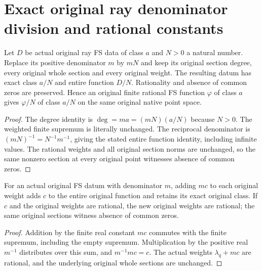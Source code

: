 \section{Exact original ray denominator division and rational constants}

\begin{lemma}
\label{lem:native-tc-nef-fs-ray-denominator-division}
\leanok
{}
Let $D$ be actual original ray FS data of class $a$ and $N>0$ a natural
number.  Replace its positive denominator $m$ by $mN$ and keep its
original section degree, every original whole section and every original
weight.  The resulting datum has exact class $a/N$ and entire function
$D/N$.  Rationality and absence of common zeros are preserved.  Hence
an original finite rational FS function $\varphi$ of class $a$ gives
$\varphi/N$ of class $a/N$ on the same original native point space.
\end{lemma}
\begin{proof}
The degree identity is $\deg=m a=(mN)(a/N)$ because $N>0$.
The weighted finite supremum is literally unchanged.  The reciprocal
denominator is $(mN)^{-1}=N^{-1}m^{-1}$, giving the stated entire
function identity, including infinite values.  The rational weights
and all original section norms are unchanged, so the same nonzero
section at every original point witnesses absence of common zeros.
\end{proof}

\begin{lemma}
\label{lem:native-tc-nef-fs-ray-rational-weight-shift}
\leanok
{}
For an actual original FS datum with denominator $m$, adding $m c$ to
each original weight adds $c$ to the entire original function and
retains its exact original class.  If $c$ and the original weights are
rational, the new original weights are rational; the same original
sections witness absence of common zeros.
\end{lemma}
\begin{proof}
Addition by the finite real constant $mc$ commutes with the finite
supremum, including the empty supremum.  Multiplication by the positive
real $m^{-1}$ distributes over this sum, and $m^{-1}mc=c$.
The actual weights $\lambda_q+mc$ are rational, and the underlying
original whole sections are unchanged.
\end{proof}

